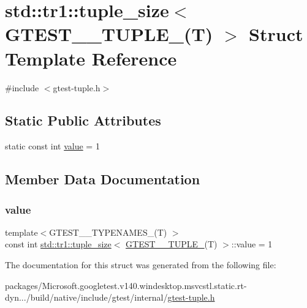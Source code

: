 \hypertarget{structstd_1_1tr1_1_1tuple__size_3_01_g_t_e_s_t__1___t_u_p_l_e___07_t_08_01_4}{}\section{std\+::tr1\+::tuple\+\_\+size$<$ G\+T\+E\+S\+T\+\_\+\_\+\+T\+U\+P\+L\+E\+\_\+(T) $>$ Struct Template Reference}
\label{structstd_1_1tr1_1_1tuple__size_3_01_g_t_e_s_t__1___t_u_p_l_e___07_t_08_01_4}


{\ttfamily \#include $<$gtest-\/tuple.\+h$>$}

\subsection*{Static Public Attributes}
\begin{DoxyCompactItemize}
\item 
static const int \mbox{\hyperlink{structstd_1_1tr1_1_1tuple__size_3_01_g_t_e_s_t__1___t_u_p_l_e___07_t_08_01_4_a02cb0da1163ad7eb74782b8f63420d5a}{value}} = 1
\end{DoxyCompactItemize}


\subsection{Member Data Documentation}
\mbox{\label{structstd_1_1tr1_1_1tuple__size_3_01_g_t_e_s_t__1___t_u_p_l_e___07_t_08_01_4_a02cb0da1163ad7eb74782b8f63420d5a}} 
\subsubsection{\texorpdfstring{value}{value}}
{\footnotesize\ttfamily template$<$G\+T\+E\+S\+T\+\_\+\_\+\+T\+Y\+P\+E\+N\+A\+M\+E\+S\+\_\+(\+T) $>$ \\
const int \mbox{\hyperlink{structstd_1_1tr1_1_1tuple__size}{std\+::tr1\+::tuple\+\_\+size}}$<$ \mbox{\hyperlink{namespacestd_1_1tr1_a9971f52f994f142fe36c786b991cfd3e}{G\+T\+E\+S\+T\+\_\+\_\+\+T\+U\+P\+L\+E\+\_\+}}(T) $>$\+::value = 1\hspace{0.3cm}{\ttfamily [static]}}



The documentation for this struct was generated from the following file\+:\begin{DoxyCompactItemize}
\item 
packages/\+Microsoft.\+googletest.\+v140.\+windesktop.\+msvcstl.\+static.\+rt-\/dyn.../build/native/include/gtest/internal/\mbox{\hyperlink{gtest-tuple_8h}{gtest-\/tuple.\+h}}\end{DoxyCompactItemize}
